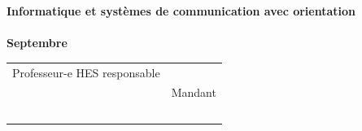 \begin{titlepage}
\begin{center}
{{{				 \fontsize{14pt}{20pt} \textbf{Informatique et systèmes de communication avec orientation\\ \Orientation }\\[32pt]
				
				\textbf{Septembre \Year}}\\[49pt]
				
				{
					\begin{tabular*}{16cm}{>{\centering}m{7.59cm}>{\centering}m{7.58cm}}
						Professeur-e HES responsable\\[13pt]
						\textbf{ \Professor }
						&
						Mandant\\[12pt]
						\textbf{ \Client }
					\end{tabular*}
				}
			}
			\vfill
		}%
	\end{center}
\end{titlepage}
\addtocounter{page}{1}
